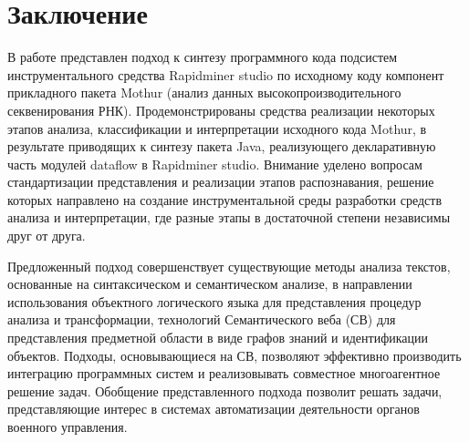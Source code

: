 \documentclass[12pt]{article}
\begin{document}
\section*{Заключение}

В работе представлен подход к синтезу программного кода подсистем инструментального средства Rapidminer studio по исходному коду компонент прикладного пакета Mothur (анализ данных высокопроизводительного секвенирования РНК). Продемонстрированы средства реализации некоторых этапов анализа, классификации и интерпретации исходного кода Mothur, в результате приводящих к синтезу пакета Java, реализующего декларативную часть модулей dataflow в Rapidminer studio. Внимание уделено вопросам стандартизации представления и реализации этапов распознавания, решение которых направлено на создание инструментальной среды разработки средств анализа и интерпретации, где разные этапы в достаточной степени независимы друг от друга.

Предложенный подход совершенствует существующие методы анализа текстов, основанные на синтаксическом и семантическом анализе, в направлении использования объектного логического языка для представления процедур анализа и трансформации, технологий Семантического веба (СВ) для представления предметной области в виде графов знаний и идентификации объектов.  Подходы, основывающиеся на СВ, позволяют эффективно производить интеграцию программных систем и реализовывать совместное многоагентное решение задач.  Обобщение представленного подхода позволит решать задачи, представляющие
интерес в системах автоматизации деятельности органов военного управления.
\end{document}
